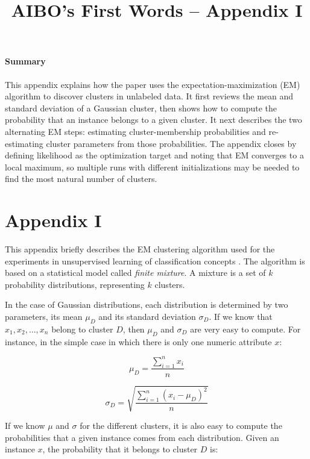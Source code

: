 \documentclass[11pt]{article}
\title{AIBO's First Words -- Appendix I}
\author{}
\date{}
\begin{document}
\maketitle

\paragraph{Summary}
This appendix explains how the paper uses the expectation-maximization (EM) algorithm to discover clusters in unlabeled data. It first reviews the mean and standard deviation of a Gaussian cluster, then shows how to compute the probability that an instance belongs to a given cluster. It next describes the two alternating EM steps: estimating cluster-membership probabilities and re-estimating cluster parameters from those probabilities. The appendix closes by defining likelihood as the optimization target and noting that EM converges to a local maximum, so multiple runs with different initializations may be needed to find the most natural number of clusters.

\section*{Appendix I}

This appendix briefly describes the EM clustering algorithm used for the experiments in unsupervised learning of classification concepts \cite{witten_eibe_2000}. The algorithm is based on a statistical model called \emph{finite mixture}. A mixture is a set of $k$ probability distributions, representing $k$ clusters.

In the case of Gaussian distributions, each distribution is determined by two parameters, its mean $\mu_D$ and its standard deviation $\sigma_D$. If we know that $x_1, x_2, \ldots, x_n$ belong to cluster $D$, then $\mu_D$ and $\sigma_D$ are very easy to compute. For instance, in the simple case in which there is only one numeric attribute $x$:

\begin{equation}
\mu_D = \frac{\sum_{i=1}^{n} x_i}{n}
\end{equation}

\begin{equation}
\sigma_D =
\sqrt{\frac{\sum_{i=1}^{n} (x_i - \mu_D)^2}{n}}
\end{equation}

If we know $\mu$ and $\sigma$ for the different clusters, it is also easy to compute the probabilities that a given instance comes from each distribution. Given an instance $x$, the probability that it belongs to cluster $D$ is:
\end{document}
